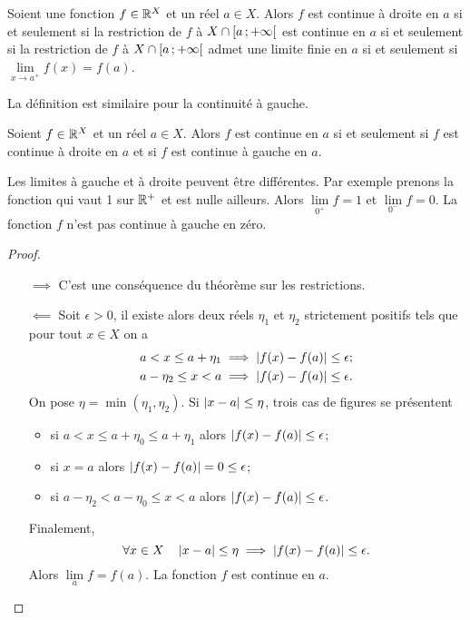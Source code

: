 \begin{defdef}
  Soient une fonction $f \in \mathbb{R}^X$ et un réel $a \in X$. Alors $f$ est continue à droite en $a$ si et seulement si la restriction de $f$ à $X\cap\left[ a \, ;  +\infty \right[$ est continue en $a$ si et seulement si la restriction de $f$ à $X\cap \left[ a \, ;  +\infty \right[$ admet une limite finie en $a$ si et seulement si $\lim\limits_{x \to a^{+}}f(x) = f(a)$.
\end{defdef}
La définition est similaire pour la continuité à gauche.
\begin{prop}
  Soient $f \in \mathbb{R}^X$ et un réel $a \in X$. Alors $f$ est continue en $a$ si et seulement si $f$ est continue à droite en $a$ et si $f$ est continue à gauche en $a$.
\end{prop}
Les limites à gauche et à droite peuvent être différentes. Par exemple prenons la fonction qui vaut 1 sur $\mathbb{R}^{+}$ et est nulle ailleurs. Alors $\lim\limits_{0^{+}} f=1$ et $\lim\limits_{0^{-}} f=0$. La fonction $f$ n'est pas continue à gauche en zéro.
\begin{proof}
  \begin{itemize}
  \item[$\implies$] C'est une conséquence du théorème sur les restrictions.
  \item[$\impliedby$] Soit $\epsilon > 0$, il existe alors deux réels $\eta_1$ et $\eta_2$ strictement positifs tels que pour tout $x \in X$ on a
    \begin{align}
      a < x \leq a +\eta_1 \implies \left\lvert f(x)-f(a)\right\rvert \leq \epsilon;\\
      a-\eta_2 \leq x < a \implies \left\lvert f(x)-f(a)\right\rvert \leq \epsilon.
    \end{align}
    On pose $\eta=\min(\eta_1,\eta_2)$. Si $\left\lvert x-a\right\rvert \leq \eta$, trois cas de figures se présentent
    \begin{itemize}
    \item si $a < x \leq a+\eta_0 \leq a+\eta_1$ alors $\left\lvert f(x)-f(a)\right\rvert \leq \epsilon$;
    \item si $x=a$ alors $\left\lvert f(x)-f(a)\right\rvert = 0 \leq \epsilon$;
    \item si $a-\eta_2 < a-\eta_0 \leq x < a$ alors $\left\lvert f(x)-f(a)\right\rvert \leq \epsilon$.
    \end{itemize}
    Finalement,
    \begin{equation}
      \forall x \in X \quad \left\lvert x-a\right\rvert \leq \eta \implies \left\lvert f(x)-f(a)\right\rvert \leq \epsilon.
    \end{equation}
    Alors $\lim\limits_{a} f=f(a)$. La fonction $f$ est continue en $a$.
  \end{itemize}
\end{proof}

